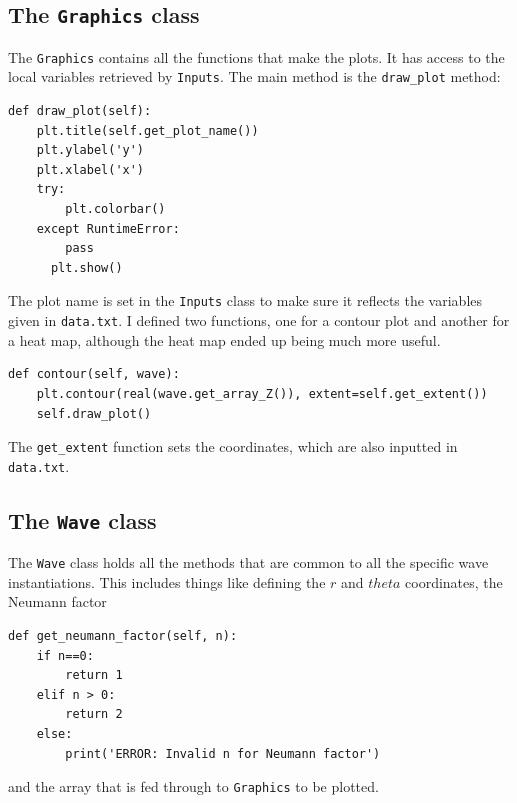 \subsection{The \texttt{Graphics} class}

The \verb!Graphics! contains all the functions that make the plots. It has access to the local variables retrieved by \verb!Inputs!. The main method is the \verb!draw_plot! method:
\begin{lstlisting}
def draw_plot(self):
    plt.title(self.get_plot_name())
    plt.ylabel('y')
    plt.xlabel('x')
    try:
        plt.colorbar()
    except RuntimeError:
        pass
      plt.show()\end{lstlisting}

The plot name is set in the \verb!Inputs! class to make sure it reflects the variables given in \verb!data.txt!. I defined two functions, one for a contour plot and another for a heat map, although the heat map ended up being much more useful.

\begin{lstlisting}
def contour(self, wave):
    plt.contour(real(wave.get_array_Z()), extent=self.get_extent())
    self.draw_plot()\end{lstlisting}

The \verb!get_extent! function sets the coordinates, which are also inputted in \verb!data.txt!.

\subsection{The \texttt{Wave} class}
%
The \verb!Wave! class holds all the methods that are common to all the specific wave instantiations. This includes things like defining the $r$ and $theta$ coordinates, the Neumann factor

\begin{lstlisting}
def get_neumann_factor(self, n):
    if n==0:
        return 1
    elif n > 0:
        return 2
    else:
        print('ERROR: Invalid n for Neumann factor')\end{lstlisting}

and the array that is fed through to \verb!Graphics! to be plotted.

